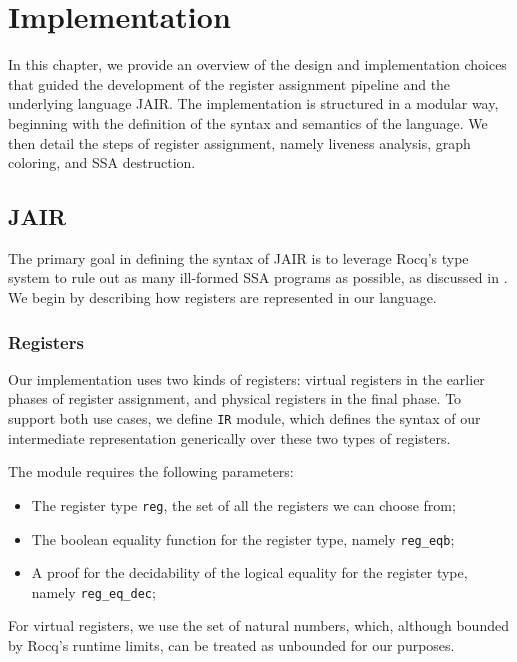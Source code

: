 
\chapter{Implementation}
\label{cha:implementation}

In this chapter, we provide an overview of the design and implementation choices that guided the development of the register assignment pipeline and the underlying language JAIR. The implementation is structured in a modular way, beginning with the definition of the syntax and semantics of the language. We then detail the steps of register assignment, namely liveness analysis, graph coloring, and SSA destruction.

\section{JAIR}
\label{sec:jair}

The primary goal in defining the syntax of JAIR is to leverage Rocq’s type system to rule out as many ill-formed SSA programs as possible, as discussed in . We begin by describing how registers are represented in our language.

\subsection{Registers}

Our implementation uses two kinds of registers: virtual registers in the earlier phases of register assignment, and physical registers in the final phase. To support both use cases, we define \texttt{IR} module, which defines the syntax of our intermediate representation generically over these two types of registers.

The module requires the following parameters:
\begin{itemize}
    \item The register type \texttt{reg}, the set of all the registers we can choose from;
    \item The boolean equality function for the register type, namely \texttt{reg\_eqb};
    \item A proof for the decidability of the logical equality for the register type, namely \texttt{reg\_eq\_dec};
\end{itemize}

For virtual registers, we use the set of natural numbers, which, although bounded by Rocq's runtime limits, can be treated as unbounded for our purposes.

